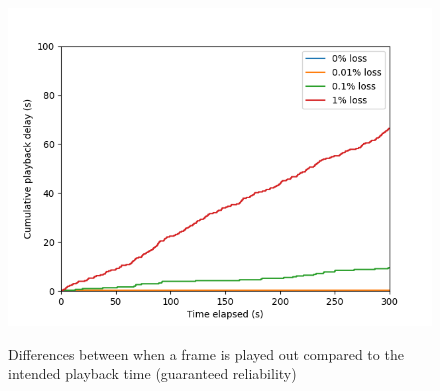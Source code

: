 \documentclass{mpaper}
\begin{document}
\begin{figure}
{   \includegraphics[scale=0.5]{images/graphics-reliable/150ms-offsets-combined-reliable.png}
   \label{playback-rel-150}
 }
 \caption{Differences between when a frame is played out compared to the intended playback time (guaranteed reliability)}
 \label{playback-rel}
\end{figure}
\end{document}
